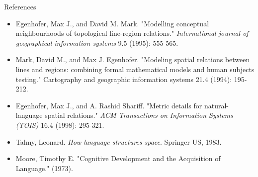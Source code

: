 \documentclass{beamer}
\begin{document}
	\begin{comment}
		- citing style chicago
		- sorted by relevance
	\end{comment}
	\begin{frame}{References}
		\begin{itemize}
			\item Egenhofer, Max J., and David M. Mark. "Modelling conceptual neighbourhoods of topological line-region relations." \textit{International journal of geographical information systems} 9.5 (1995): 555-565.
			
			\item Mark, David M., and Max J. Egenhofer. "Modeling spatial relations between lines and regions: combining formal mathematical models and human subjects testing." Cartography and geographic information systems 21.4 (1994): 195-212.
			
			\item Egenhofer, Max J., and A. Rashid Shariff. "Metric details for natural-language spatial relations." \textit{ACM Transactions on Information Systems (TOIS)} 16.4 (1998): 295-321.

			\item Talmy, Leonard. \textit{How language structures space}. Springer US, 1983.

			\item Moore, Timothy E. "Cognitive Development and the Acquisition of Language." (1973).
		\end{itemize}
	\end{frame}
	
\end{document}
